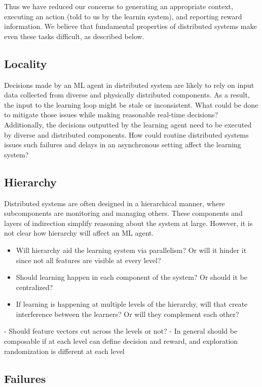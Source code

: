 \documentclass[a4paper,twocolumn]{article}
\begin{document}
Thus we have reduced our concerns to generating an appropriate context,
executing an action (told to us by the learnin system), and reporting reward
information.  We believe that fundamental properties of distributed systems make
even these tasks difficult, as described below.

\subsection*{Locality}

Decisions made by an ML agent in distributed system are likely to rely on input
data collected from diverse and physically distributed components. As a result,
the input to the learning loop might be stale or inconsistent. What could be
done to mitigate those issues while making reasonable real-time decisions?
Additionally, the decisions outputted by the learning agent need to be executed
by diverse and distributed components. How could routine distributed systems
issues such failures and delays in an asynchronous setting affect the learning
system?

\subsection*{Hierarchy}
Distributed systems are often designed in a hierarchical manner, where
subcomponents are monitoring and managing others. These components and layers of
indirection simplify reasoning about the system at large. However, it is not
clear how hierarchy will affect an ML agent.
\begin{itemize}
  \item Will hierarchy aid the learning system via parallelism? Or will it hinder
    it since not all features are visible at every level?
  \item Should learning happen in each component of the system? Or should it be
    centralized?
  \item If learning is happening at multiple levels of the hierarchy, will that
    create interference between the learners? Or will they complement each
    other?
\end{itemize}

- Should feature vectors cut across the levels or not?
- In general should be composable if at each level can define decision and reward,
and exploration randomization is different at each level

\subsection*{Failures}
\end{document}

